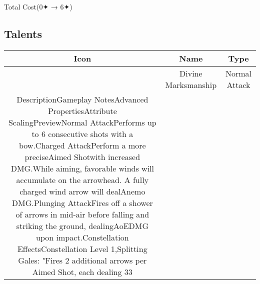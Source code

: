 \documentclass[a4paper,12pt]{article}
\begin{document}
Total Cost(0✦ → 6✦)\\ \par \vspace{0.5cm}

\subsection*{Talents}\n\n\begin{tabular}{|c|c|c|} \hline
Icon & Name & Type \\
 \hline
 & Divine Marksmanship & Normal Attack \\
DescriptionGameplay NotesAdvanced PropertiesAttribute ScalingPreviewNormal AttackPerforms up to 6 consecutive shots with a bow.Charged AttackPerform a more preciseAimed Shotwith increased DMG.While aiming, favorable winds will accumulate on the arrowhead. A fully charged wind arrow will dealAnemo DMG.Plunging AttackFires off a shower of arrows in mid-air before falling and striking the ground, dealingAoEDMG upon impact.Constellation EffectsConstellation Level 1,Splitting Gales: "Fires 2 additional arrows per Aimed Shot, each dealing 33%
\end{tabular}
\end{document}
